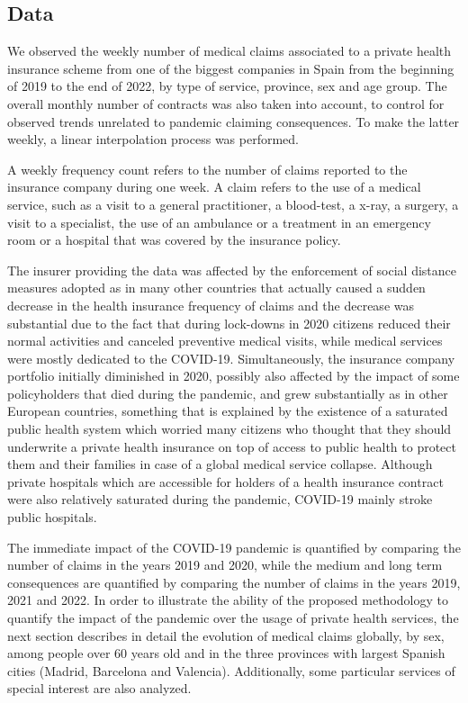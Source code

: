 \documentclass[]{risa}
\begin{document}
\subsection{Data}\label{data}

We observed  the weekly number of medical claims associated to a private health insurance scheme from one of the biggest companies in Spain from the beginning of 2019 to the end of 2022, by type of service, province, sex and age group. The overall monthly number of contracts was also taken into account, to control for observed trends unrelated to pandemic claiming consequences. To make the latter weekly, a linear interpolation process was performed. 

A weekly frequency count refers to the number of claims reported to the insurance company during one week. A claim refers to the use of a medical service, such as a visit to a general practitioner, a blood-test, a x-ray, a surgery, a visit to a specialist, the use of an ambulance or a treatment in an emergency room or a hospital that was covered by the insurance policy.

The insurer providing the data was affected by the enforcement of social distance measures adopted as in many other countries that actually caused a sudden decrease in the health insurance frequency of claims and the decrease was substantial due to the fact that during lock-downs in 2020 citizens reduced their normal activities and canceled preventive medical visits, while medical services were mostly dedicated to the COVID-19. Simultaneously, the insurance company portfolio initially diminished in 2020, possibly also affected by the impact of some policyholders that died during the pandemic, and grew substantially as in other European countries, something that is explained by the existence of a saturated public health system which worried many citizens who thought that they should underwrite a private health insurance on top of access to public health to protect them and their families in case of a global medical service collapse. Although private hospitals which are accessible for holders of a health insurance contract were also relatively saturated during the pandemic, COVID-19 mainly stroke public hospitals. 

The immediate impact of the COVID-19 pandemic is quantified by comparing the number of claims in the years 2019 and 2020, while the medium and long term consequences are quantified by comparing the number of claims in the years 2019, 2021 and 2022. In order to illustrate the ability of the proposed methodology to quantify the impact of the pandemic over the usage of private health services, the next section describes in detail the evolution of medical claims globally, by sex, among people over 60 years old and in the three provinces with largest Spanish cities (Madrid, Barcelona and Valencia). Additionally, some particular services of special interest are also analyzed.
\end{document}
